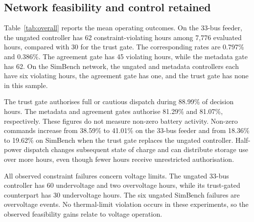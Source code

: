 \documentclass[11pt,a4paper]{article}
\begin{document}
\subsection{Network feasibility and control retained}
Table~\ref{tab:overall} reports the mean operating outcomes. On the 33-bus feeder, the ungated controller has 62 constraint-violating hours among 7,776 evaluated hours, compared with 30 for the trust gate. The corresponding rates are 0.797\% and 0.386\%. The agreement gate has 45 violating hours, while the metadata gate has 62. On the SimBench network, the ungated and metadata controllers each have six violating hours, the agreement gate has one, and the trust gate has none in this sample.

The trust gate authorises full or cautious dispatch during 88.99\% of decision hours. The metadata and agreement gates authorise 81.29\% and 81.07\%, respectively. These figures do not measure non-zero battery activity. Non-zero commands increase from 38.59\% to 41.01\% on the 33-bus feeder and from 18.36\% to 19.62\% on SimBench when the trust gate replaces the ungated controller. Half-power dispatch changes subsequent state of charge and can distribute storage use over more hours, even though fewer hours receive unrestricted authorisation.

All observed constraint failures concern voltage limits. The ungated 33-bus controller has 60 undervoltage and two overvoltage hours, while its trust-gated counterpart has 30 undervoltage hours. The six ungated SimBench failures are overvoltage events. No thermal-limit violation occurs in these experiments, so the observed feasibility gains relate to voltage operation.
\end{document}

